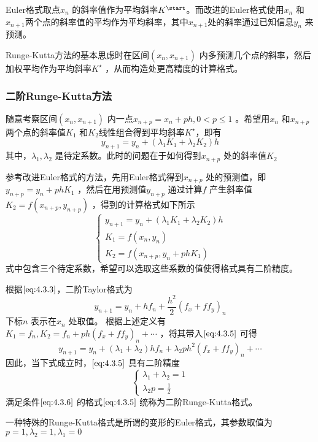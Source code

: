 \documentclass[a4paper]{article}
\begin{document}
Euler格式取点$x_{n}$ 的斜率值作为平均斜率$K^{\start}$。而改进的Euler格式使用$x_{n}$ 和$x_{n+1}$两个点的斜率值的平均作为平均斜率，其中$x_{n+1}$处的斜率通过已知信息$y_{n}$ 来预测。

Runge-Kutta方法的基本思虑时在区间$(x_{n},x_{n+1})$ 内多预测几个点的斜率，然后加权平均作为平均斜率$K^{\star}$ ，从而构造处更高精度的计算格式。

\subsubsection{二阶Runge-Kutta方法}
随意考察区间$(x_{n},x_{n+1})$ 内一点$x_{n+p} = x_{n} + ph, 0 < p \le 1$ 。希望用$x_{n}$ 和$x_{n+p}$ 两个点的斜率值$K_1$ 和$K_2$线性组合得到平均斜率$K^{\star}$，即有
\[
y_{n+1} = y_{n} + (\lambda_1 K_1 + \lambda_2 K_2) h
\] 
其中，$\lambda_1, \lambda_2$ 是待定系数。此时的问题在于如何得到$x_{n+p}$ 处的斜率值$K_2$

参考改进Euler格式的方法，先用Euler格式得到$x_{n+p}$ 处的预测值，即$y_{n+p} = y_{n} + ph K_1$ ，然后在用预测值$y_{n+p}$ 通过计算$f$ 产生斜率值$K_2 = f(x_{n+p}, y_{n+p})$ ，得到的计算格式如下所示
\[
\tag{4.3.5} \label{eq:4.3.5} 
\begin{cases}
	y_{n+1} = y_{n} + (\lambda_1 K_1 + \lambda_2 K_2) h \\
	K_1 = f(x_{n}, y_{n}) \\
	K_2 = f(x_{n+p}, y_{n} + ph K_1)
\end{cases} 
\] 
式中包含三个待定系数，希望可以选取这些系数的值使得格式具有二阶精度。

根据$\ref{eq:4.3.3}$，二阶Taylor格式为 
\[
y_{n+1} = y_{n} + h f_n + \frac{h^2}{2} (f_x + f f_y)_n
\] 
下标$n$ 表示在$x_n$ 处取值。
根据上述定义有$K_1 = f_n, K_2 = f_n + ph(f_x + f f_y)_n + \cdots$ ，将其带入$\ref{eq:4.3.5}$ 可得
\[
y_{n+1} = y_n + (\lambda_1 + \lambda_2) h f_n + \lambda_2 p h^2 (f_x + f f_y)_n + \cdots
\] 
因此，当下式成立时，$\ref{eq:4.3.5}$ 具有二阶精度
\[
\tag{4.3.6} \label{eq:4.3.6} 
\begin{cases}
	\lambda_1 + \lambda_2 = 1 \\
	\lambda_2 p = \frac{1}{2}
\end{cases} 
\] 
满足条件$\ref{eq:4.3.6}$ 的格式$\ref{eq:4.3.5}$ 统称为二阶Runge-Kutta格式。

一种特殊的Runge-Kutta格式是所谓的变形的Euler格式，其参数取值为$p=1,\lambda_2=1,\lambda_1=0$
\end{document}
